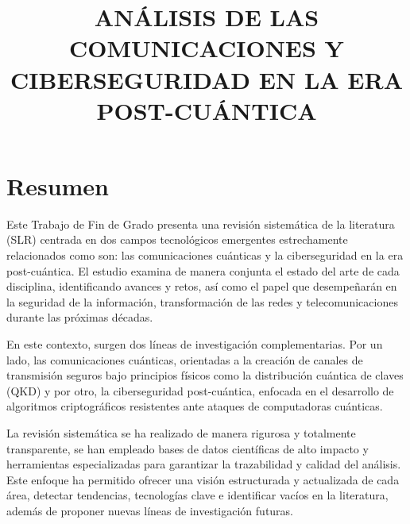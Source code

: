 \documentclass[minitoc, hidelinks, headlogo, framedcover]{tfeEPCC}
\title{ANÁLISIS DE LAS COMUNICACIONES Y CIBERSEGURIDAD EN LA ERA POST-CUÁNTICA}
\begin{document}
\sloppy 
\pagebreak 


\pagestyle{empty}




\chapter*{Resumen}
Este Trabajo de Fin de Grado presenta una revisión sistemática de la literatura (SLR) centrada en dos campos tecnológicos emergentes estrechamente relacionados como son: las comunicaciones cuánticas y la ciberseguridad en la era post-cuántica. El estudio examina de manera conjunta el estado del arte de cada disciplina, identificando avances y retos, así como el papel que desempeñarán en la seguridad de la información,  transformación de las redes y telecomunicaciones durante las próximas décadas.

En este contexto, surgen dos líneas de investigación complementarias. Por un lado, las comunicaciones cuánticas, orientadas a la creación de canales de transmisión seguros bajo principios físicos como la distribución cuántica de claves (QKD) y por otro, la ciberseguridad post-cuántica, enfocada en el desarrollo de algoritmos criptográficos resistentes ante ataques de computadoras cuánticas.

La revisión sistemática se ha realizado de manera rigurosa y totalmente transparente, se han empleado bases de datos científicas de alto impacto y herramientas especializadas para garantizar la trazabilidad y calidad del análisis. Este enfoque ha permitido ofrecer una visión estructurada y actualizada de cada área, detectar tendencias, tecnologías clave e identificar vacíos en la literatura, además de proponer nuevas líneas de investigación futuras.
\end{document}
